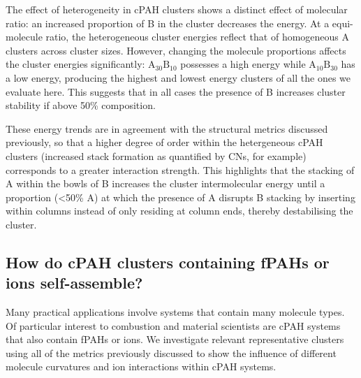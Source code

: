The effect of heterogeneity in cPAH clusters shows a distinct effect of molecular ratio: an increased proportion of B in the cluster decreases the energy. At a equi-molecule ratio, the heterogeneous cluster energies reflect that of homogeneous A clusters across cluster sizes. However, changing the molecule proportions affects the cluster energies significantly: $\text{A}_{\text{30}}\text{B}_{\text{10}}$ possesses a high energy while $\text{A}_{\text{10}}\text{B}_{\text{30}}$ has a low energy, producing the highest and lowest energy clusters of all the ones we evaluate here. This suggests that in all cases the presence of B increases cluster stability if above 50\% composition.

These energy trends are in agreement with the structural metrics discussed previously, so that a higher degree of order within the hetergeneous cPAH clusters (increased stack formation as quantified by CNs, for example) corresponds to a greater interaction strength. This highlights that the stacking of A within the bowls of B increases the cluster intermolecular energy until a proportion (<50\% A) at which the presence of A disrupts B stacking by inserting within columns instead of only residing at column ends, thereby destabilising the cluster.

\subsection{How do cPAH clusters containing fPAHs or ions self-assemble?}

Many practical applications involve systems that contain many molecule types. Of particular interest to combustion and material scientists are cPAH systems that also contain fPAHs or ions. We investigate relevant representative clusters using all of the metrics previously discussed to show the influence of different molecule curvatures and ion interactions within cPAH systems.

